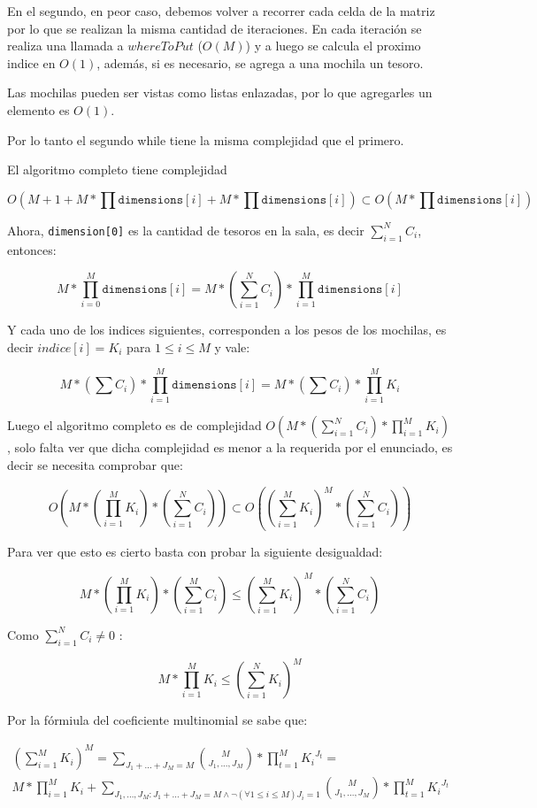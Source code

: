 En el segundo, en peor caso, debemos volver a recorrer cada celda de la matriz por lo que se realizan la misma cantidad de iteraciones. En cada iteración se realiza una llamada a $whereToPut$ ($O(M)$) y a luego se calcula el proximo indice en $O(1)$, además, si es necesario, se agrega a una mochila un tesoro.

Las mochilas pueden ser vistas como listas enlazadas, por lo que agregarles un elemento es $O(1)$.

Por lo tanto el segundo while tiene la misma complejidad que el primero.

El algoritmo completo tiene complejidad 

$$O\left(M + 1 + M*\prod\texttt{dimensions}[i] + M*\prod\texttt{dimensions}[i]\right) \subset O\left(M*\prod\texttt{dimensions}[i]\right)$$

Ahora, \texttt{dimension[0]} es la cantidad de tesoros en la sala, es decir $\sum_{i=1}^N C_i$, entonces:

$$ M*\prod_{i=0}^M\texttt{dimensions}[i] = M*\left(\sum_{i=1}^N C_i\right)*\prod_{i=1}^M\texttt{dimensions}[i]$$

Y cada uno de los indices siguientes, corresponden a los pesos de los mochilas, es decir $indice[i] = K_i$ para $1 \leq i \leq M$ y vale:

$$M*\left(\sum C_i\right)*\prod_{i=1}^M\texttt{dimensions}[i] = M*\left(\sum C_i\right)*\prod_{i=1}^M K_i$$

Luego el algoritmo completo es de complejidad $O(M*\left(\sum_{i=1}^N C_i\right)*\prod_{i=1}^M K_i)$, solo falta ver que dicha complejidad es menor a la requerida por el enunciado, es decir se necesita comprobar que:


\[
O\left(M*\left(\prod_{i=1}^{M}{K_i}\right)*\left(\sum_{i=1}^{N}{C_i}\right)\right) \subset O\left(\left(\sum_{i=1}^{M}{K_i}\right)^{M}*\left(\sum_{i=1}^{N}{C_i}\right)\right)
\]

Para ver que esto es cierto basta con probar la siguiente desigualdad:

\[
M*\left(\prod_{i=1}^{M}{K_i}\right)*\left(\sum_{i=1}^{M}{C_i}\right) \leq \left(\sum_{i=1}^{M}{K_i}\right)^{M}*\left(\sum_{i=1}^{N}{C_i}\right)
\]

Como $\sum_{i=1}^{N}{C_i} \neq 0$ :

\[
M*\prod_{i=1}^{M}{K_i} \leq \left(\sum_{i=1}^{N}{K_i}\right)^{M}
\]

Por la fórmiula del coeficiente multinomial se sabe que:

\begin{align*}
\left(\sum_{i=1}^{M}{K_i}\right)^{M} =  \sum_{J_1+...+J_M=M}\binom{M}{ J_1,...,J_M}*\prod_{t=1}^{M}{K_i}^{J_t} = \\
M * \prod_{i=1}^M K_i + 
\sum_{ J_1,\dots,J_M : J_1 + \dots + J_M = M \land  \lnot (\forall 1 \leq i \leq M) J_i = 1}\binom{M}{ J_1,...,J_M}*\prod_{t=1}^{M}{K_i}^{J_t}
\end{align*}

